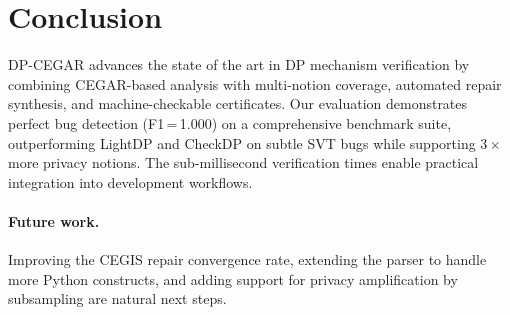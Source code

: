 \documentclass[sigplan,screen,nonacm]{acmart}
\begin{document}
\section{Conclusion}
\label{sec:conclusion}

\textsc{DP-CEGAR} advances the state of the art in DP mechanism verification
by combining CEGAR-based analysis with multi-notion coverage, automated repair
synthesis, and machine-checkable certificates. Our evaluation demonstrates
perfect bug detection (F1\,=\,1.000) on a comprehensive benchmark suite,
outperforming LightDP and CheckDP on subtle SVT bugs while supporting $3\times$
more privacy notions. The sub-millisecond verification times enable practical
integration into development workflows.

\paragraph{Future work.}
Improving the CEGIS repair convergence rate, extending the parser to handle
more Python constructs, and adding support for privacy amplification by
subsampling are natural next steps.


\end{document}
